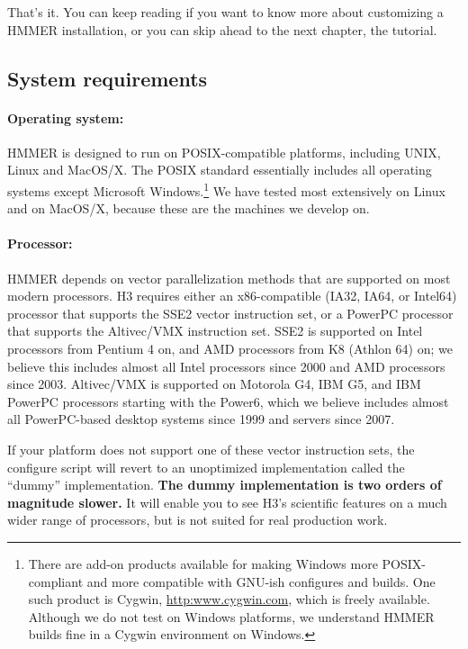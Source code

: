 
That's it.  You can keep reading if you want to know more about
customizing a HMMER installation, or you can skip ahead to the next
chapter, the tutorial.

\subsection{System requirements}

\paragraph{Operating system:} HMMER is designed to run on
POSIX-compatible platforms, including UNIX, Linux and MacOS/X. The
POSIX standard essentially includes all operating systems except
Microsoft Windows.\footnote{There are add-on products available for
  making Windows more POSIX-compliant and more compatible with GNU-ish
  configures and builds. One such product is Cygwin,
  \url{http:www.cygwin.com}, which is freely available. Although we do
  not test on Windows platforms, we understand HMMER builds fine in a
  Cygwin environment on Windows.}  We have tested most extensively on
Linux and on MacOS/X, because these are the machines we develop on. 

\paragraph{Processor:} HMMER depends on vector parallelization methods
that are supported on most modern processors. H3 requires either an
x86-compatible (IA32, IA64, or Intel64) processor that supports the
SSE2 vector instruction set, or a PowerPC processor that supports the
Altivec/VMX instruction set. SSE2 is supported on Intel processors
from Pentium 4 on, and AMD processors from K8 (Athlon 64) on; we
believe this includes almost all Intel processors since 2000 and AMD
processors since 2003. Altivec/VMX is supported on Motorola G4, IBM
G5, and IBM PowerPC processors starting with the Power6, which we
believe includes almost all PowerPC-based desktop systems since 1999
and servers since 2007.

If your platform does not support one of these vector instruction
sets, the configure script will revert to an unoptimized
implementation called the ``dummy'' implementation. \textbf{The dummy
  implementation is two orders of magnitude slower.} It will enable
you to see H3's scientific features on a much wider range of
processors, but is not suited for real production work.

